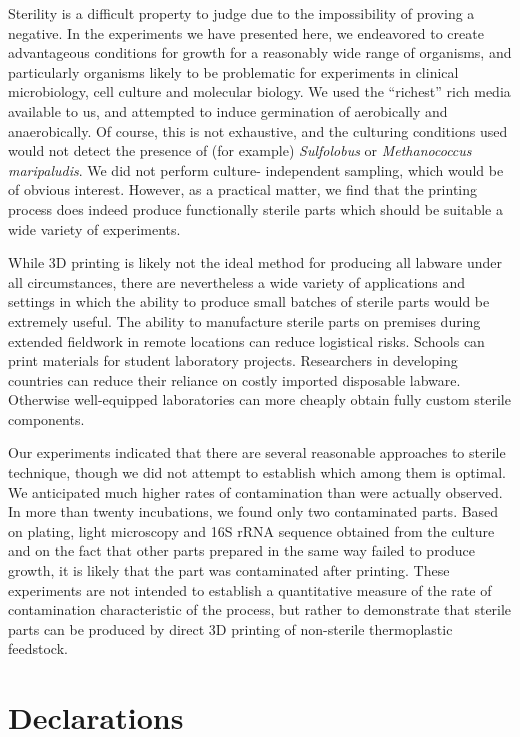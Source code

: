 \documentclass[fleqn,10pt]{wlpeerj}
\begin{document}
Sterility is a difficult property to judge due to the impossibility of proving
a negative. In the experiments we have presented here, we endeavored to create
advantageous conditions for growth for a reasonably wide range of organisms,
and particularly organisms likely to be problematic for experiments in
clinical microbiology, cell culture and molecular biology. We used the
``richest'' rich media available to us, and attempted to induce germination of
aerobically and anaerobically. Of course, this is not exhaustive, and  the
culturing conditions used would not detect the presence of (for example) {\em
Sulfolobus} or {\em Methanococcus maripaludis}. We did not perform culture-
independent sampling, which would be of obvious interest. However, as a
practical matter, we find that the printing process does indeed produce
functionally sterile parts which should be suitable a wide variety of
experiments.

While 3D printing is likely not the ideal method for producing all labware
under all circumstances, there are nevertheless a wide variety of applications
and settings in which the ability to produce small batches of sterile parts
would be extremely useful. The ability to manufacture sterile parts on
premises during extended fieldwork in remote locations can reduce logistical
risks. Schools can print materials for student laboratory projects.
Researchers in developing countries can reduce their reliance on costly
imported disposable labware. Otherwise well-equipped laboratories can more
cheaply obtain fully custom sterile components.

Our experiments indicated that there are several reasonable approaches to
sterile technique, though we did not attempt to establish which among them is
optimal. We anticipated much higher rates of contamination than were actually
observed. In more than twenty incubations, we found only two contaminated
parts. Based on plating, light microscopy and 16S rRNA sequence obtained from
the culture and on the fact that other parts prepared in the same way failed
to produce growth, it is likely that the part was contaminated after printing.
These experiments are not intended to establish a quantitative measure of the
rate of contamination characteristic of the process, but rather to demonstrate
that sterile parts can be produced by direct 3D printing of non-sterile
thermoplastic feedstock.

\section{Declarations}
\end{document}
